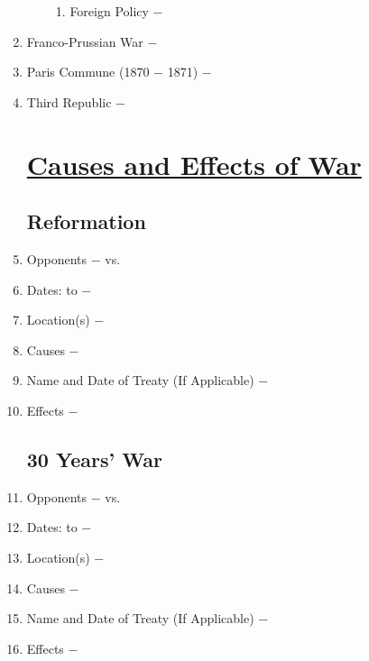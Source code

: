 \documentclass[12pt]{article}
\begin{document}
\begin{enumerate}
\begin{enumerate}[label=\arabic{*}.]
\begin{enumerate}[label=\arabic{*}.]
\item Foreign Policy $-$

\end{enumerate}
\end{enumerate}
\setcounter{enumi}{543}


\item Franco-Prussian War $-$

\item Paris Commune (1870 $-$ 1871) $-$ 

\item Third Republic $-$


\section{\underline{Causes and Effects of War}}

\subsection{Reformation} 

\item Opponents $-$ vs.

\item Dates: to $-$

\item Location(s) $-$ 

\item Causes $-$

\item Name and Date of Treaty (If Applicable) $-$ 

\item Effects $-$ 

\subsection{30 Years' War}

\item Opponents $-$ vs.

\item Dates: to $-$

\item Location(s) $-$ 

\item Causes $-$

\item Name and Date of Treaty (If Applicable) $-$ 

\item Effects $-$


\end{enumerate}
\end{document}
